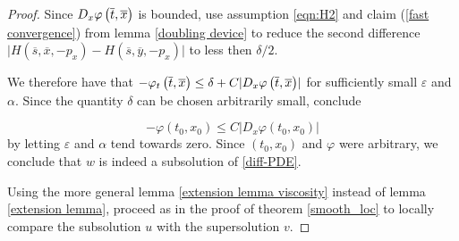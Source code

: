 \begin{theorem}
\begin{proof}
		  		Since $ D_x \varphi\left(\overline{t}, \overline{x}\right) $ is bounded, use assumption \eqref{eqn:H2} and claim (\ref{fast convergence}) from lemma \ref{doubling device} to reduce the second difference $ \lvert H(\overline{s}, \overline{x}, -p_x) - H(\overline{s}, \overline{y}, -p_x) \rvert $ to less then $ \delta / 2 $.
		  		
		  		We therefore have that $ -\varphi_t\left(\overline{t}, \overline{x}\right) \leq \delta + C \lvert D_x \varphi\left(\overline{t}, \overline{x}\right) \rvert $ for sufficiently small $ \varepsilon $ and $ \alpha $. Since the quantity $ \delta $ can be chosen arbitrarily small, conclude 
		  		
		  		\begin{equation*}
		  			- \varphi(t_0, x_0) \leq C \lvert D_x \varphi(t_0, x_0) \rvert
		  		\end{equation*}
		  		by letting $ \varepsilon $ and $ \alpha $ tend towards zero. Since $ (t_0, x_0) $ and $ \varphi $ were arbitrary, we conclude that $ w $ is indeed a subsolution of \ref{diff-PDE}.
		  		
		  		Using the more general lemma \ref{extension lemma viscosity} instead of lemma \ref{extension lemma}, proceed as in the proof of theorem \ref{smooth_loc} to locally compare the subsolution $ u $ with the supersolution $ v $.
		  	\end{proof}
		  \end{theorem}